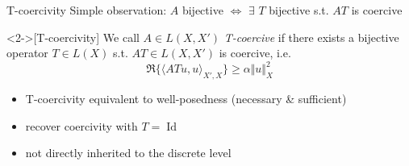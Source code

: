 \documentclass[11pt,aspectratio=169,xcolor=dvipsnames]{beamer}
\newcommand{\spl}{\langle}
\newcommand{\spr}{\rangle}
\newcommand{\Id}{\operatorname{Id}}
\newcommand{\nicearrow}[2]{\raisebox{#2}{\resizebox{0.45cm}{!}{\color{#1}{\MVRightArrow}\color{black}}}}
\begin{document}
\begin{frame}{T-coercivity}
    Simple observation: $A$ bijective $\Leftrightarrow$ $\exists$ $T$ bijective s.t. $AT$ is coercive
    \begin{definition}<2->[T-coercivity\footnotemark]
        We call $A \in L(X,X')$ \emph{T-coercive} if there exists a bijective operator $T \in L(X)$ s.t. $AT \in L(X,X')$ is coercive, i.e. 
        \begin{equation*}
            \Re \{ \spl ATu,u \spr_{X',X} \} \ge \alpha \Vert u \Vert_{X}^2
        \end{equation*}
    \end{definition}
    \begin{itemize}
        \item<3->[\nicearrow{GOE}{-0.06cm}] T-coercivity equivalent to well-posedness (necessary \& sufficient)
        \item<4->[\nicearrow{GOE}{-0.06cm}] recover coercivity with $T = \Id$ 
        \item<5->[\nicearrow{GOE}{-0.06cm}] not directly inherited to the discrete level
    \end{itemize}
\end{frame}
\end{document}
